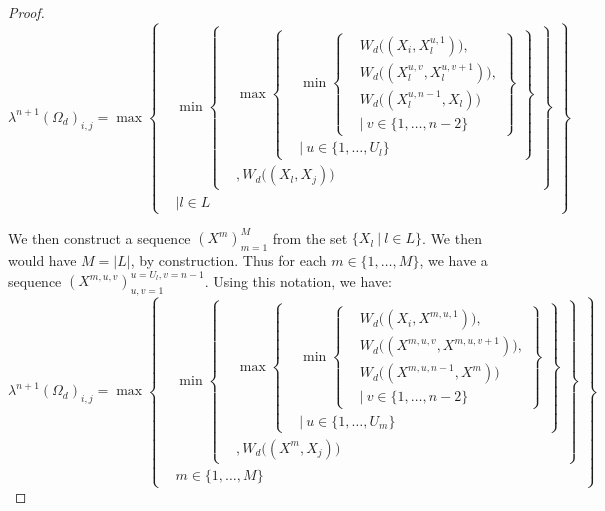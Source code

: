 \documentclass{article} %
\theoremstyle{style1}
\theoremstyle{style1}
\theoremstyle{example}
\begin{document}
\begin{proof}
\[
\lambda^{n+1}(\Omega_d)_{i,j} =\max
\left\{
  \begin{aligned}
    &\min
      \left\{
      \begin{aligned}
        &\max
          \left\{
          \begin{aligned}
            &\min\left\{
            \begin{aligned}
            &W_d\big((X_i,X_{l}^{u,1})\big), \\
            & W_d\big((X_{l}^{u,v},X_{l}^{u,v+1})\big), \\
            &W_d\big((X_{l}^{u,n-1},X_{l})\big)\ \\
            & |\ v\in\{1,\ldots,n-2\}
            \end{aligned}
            \right\} \\
            &|\ u\in\{1,\ldots,U_l\}
          \end{aligned}
          \right\} \\
          &, W_d\big((X_{l},X_j)\big)
      \end{aligned}
      \right\}\\
  &       | l\in L
  \end{aligned}
\right\}
\]

We then construct a sequence $(X^m)_{m=1}^M$ from the set $\{X_l\ |\ l\in L\}$. We then would have $M=|L|$, by construction. Thus for each $m\in \{1,\ldots,M\}$, we have a sequence $(X^{m,u,v})_{u,v=1}^{u=U_l,v=n-1}$. Using this notation, we have:
\[
\lambda^{n+1}(\Omega_d)_{i,j} =\max
\left\{
  \begin{aligned}
    &\min
      \left\{
      \begin{aligned}
        &\max
          \left\{
          \begin{aligned}
            &\min\left\{
            \begin{aligned}
            &W_d\big((X_i,X^{m,u,1})\big), \\
            & W_d\big((X^{m,u,v},X^{m,u,v+1})\big), \\
            &W_d\big((X^{m,u,n-1},X^m)\big)\ \\
            & |\ v\in\{1,\ldots,n-2\}
            \end{aligned}
            \right\} \\
            &|\ u\in\{1,\ldots,U_m\}
          \end{aligned}
          \right\} \\
          &, W_d\big((X^m,X_j)\big)
      \end{aligned}
      \right\} \\
  & m\in\{1,\ldots,M\}
  \end{aligned}
\right\}
\]


\end{proof}
\end{document}
